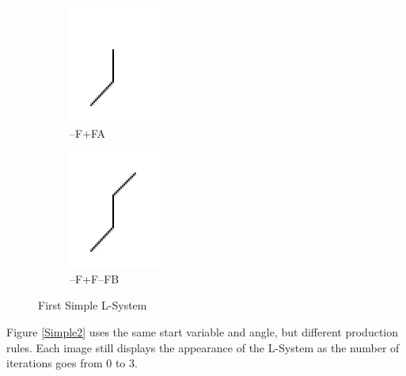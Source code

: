 \documentclass[12pt,twoside]{reedthesis}
\begin{document}
\begin{figure}[H]
\begin{subfigure}{0.25\textwidth}
		\includegraphics[height=0.8\textwidth]{Images/A2}
		\caption{–F+FA}
		\label {A2}
	\end{subfigure}%
	\begin{subfigure}{0.25\textwidth}
		\centering
		\includegraphics[height=0.8\textwidth]{Images/A3}
		\caption{–F+F–FB}
		\label {A3}
	\end{subfigure}
	\caption{First Simple L-System}
	\label{Simple1}
	\end{figure}



	Figure \ref{Simple2} uses the same start variable and angle, but different production rules. Each image still displays the appearance of the L-System as the number of iterations goes from 0 to 3. 
\end{document}
